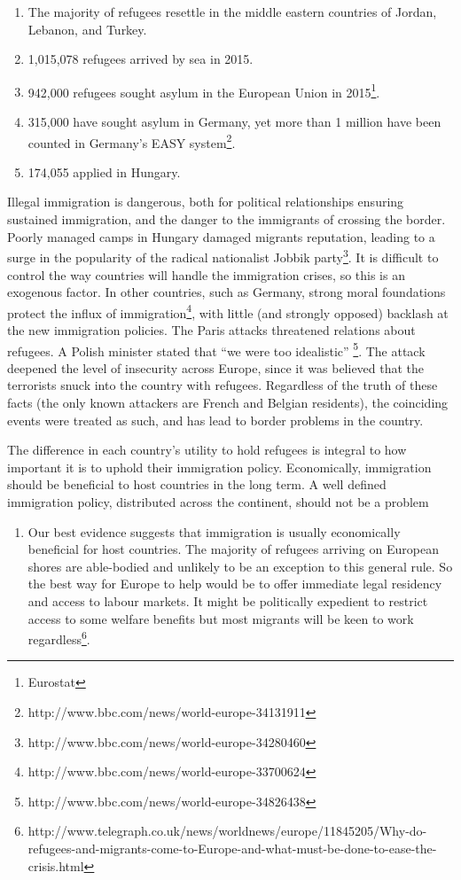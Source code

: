 \documentclass{article}
\begin{document}
\begin{enumerate}
    \item The majority of refugees resettle in the middle eastern countries of Jordan, Lebanon, and Turkey.
    \item 1,015,078 refugees arrived by sea in 2015.
    \item 942,000 refugees sought asylum in the European Union in 2015\footnote{Eurostat}.
    \item 315,000 have sought asylum in Germany, yet more than 1 million have been counted in Germany's EASY system\footnote{http://www.bbc.com/news/world-europe-34131911}.
    \item 174,055 applied in Hungary.
\end{enumerate}

Illegal immigration is dangerous, both for political relationships ensuring sustained immigration, and the danger to the immigrants of crossing the border. Poorly managed camps in Hungary damaged migrants reputation, leading to a surge in the popularity of the radical nationalist Jobbik party\footnote{http://www.bbc.com/news/world-europe-34280460}. It is difficult to control the way countries will handle the immigration crises, so this is an exogenous factor. In other countries, such as Germany, strong moral foundations protect the influx of immigration\footnote{http://www.bbc.com/news/world-europe-33700624}, with little (and strongly opposed) backlash at the new immigration policies. The Paris attacks threatened relations about refugees. A Polish minister stated that ``we were too idealistic'' \footnote{http://www.bbc.com/news/world-europe-34826438}. The attack deepened the level of insecurity across Europe, since it was believed that the terrorists snuck into the country with refugees. Regardless of the truth of these facts (the only known attackers are French and Belgian residents), the coinciding events were treated as such, and has lead to border problems in the country.

The difference in each country's utility to hold refugees is integral to how important it is to uphold their immigration policy. Economically, immigration should be beneficial to host countries in the long term. A well defined immigration policy, distributed across the continent, should not be a problem

\begin{enumerate}
    \item Our best evidence suggests that immigration is usually economically beneficial for host countries. The majority of refugees arriving on European shores are able-bodied and unlikely to be an exception to this general rule. So the best way for Europe to help would be to offer immediate legal residency and access to labour markets. It might be politically expedient to restrict access to some welfare benefits but most migrants will be keen to work regardless\footnote{http://www.telegraph.co.uk/news/worldnews/europe/11845205/Why-do-refugees-and-migrants-come-to-Europe-and-what-must-be-done-to-ease-the-crisis.html}.
\end{enumerate}
\end{document}
